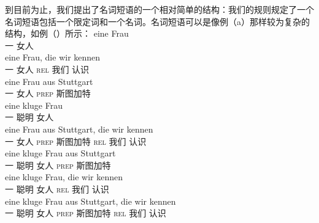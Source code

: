 到目前为止，我们提出了名词短语的一个相对简单的结构：我们的规则规定了一个名词短语包括一个限定词和一个名词。名词短语可以是像例（a）那样较为复杂的结构，如例（）所示：
\eal
\label{Beispiele-NP-Adjunkte}
\ex 
\gll eine Frau\\
	 一 女人\\
\ex 
\gll eine Frau, die wir kennen\\
	 一 女人 \textsc{rel} 我们 认识\\
\ex 
\gll eine Frau aus Stuttgart\\
	 一 女人 \textsc{prep} 斯图加特\\
\ex 
\gll eine kluge Frau\\
	 一 聪明 女人\\
\ex 
\gll eine Frau aus Stuttgart, die wir kennen\\
	 一 女人 \textsc{prep} 斯图加特 \textsc{rel} 我们 认识\\
\ex 
\gll eine kluge Frau aus Stuttgart\\
	 一 聪明 女人 \textsc{prep} 斯图加特\\
\ex 
\gll eine kluge Frau, die wir kennen\\
	 一 聪明 女人 \textsc{rel} 我们 认识\\
\ex 
\gll eine kluge Frau aus Stuttgart, die wir kennen\\
	 一 聪明 女人 \textsc{prep} 斯图加特 \textsc{rel} 我们 认识\\
\zl

